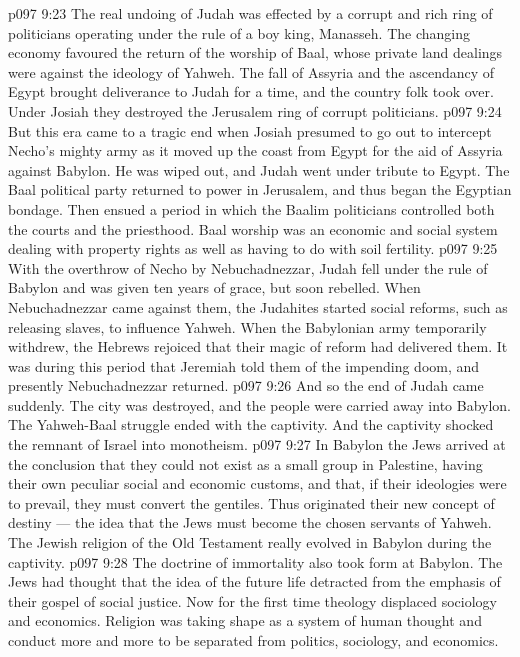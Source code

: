 \vs p097 9:23 \pc The real undoing of Judah was effected by a corrupt and rich ring of politicians operating under the rule of a boy king, Manasseh. The changing economy favoured the return of the worship of Baal, whose private land dealings were against the ideology of Yahweh. The fall of Assyria and the ascendancy of Egypt brought deliverance to Judah for a time, and the country folk took over. Under Josiah they destroyed the Jerusalem ring of corrupt politicians.
\vs p097 9:24 But this era came to a tragic end when Josiah presumed to go out to intercept Necho’s mighty army as it moved up the coast from Egypt for the aid of Assyria against Babylon. He was wiped out, and Judah went under tribute to Egypt. The Baal political party returned to power in Jerusalem, and thus began the  Egyptian bondage. Then ensued a period in which the Baalim politicians controlled both the courts and the priesthood. Baal worship was an economic and social system dealing with property rights as well as having to do with soil fertility.
\vs p097 9:25 With the overthrow of Necho by Nebuchadnezzar, Judah fell under the rule of Babylon and was given ten years of grace, but soon rebelled. When Nebuchadnezzar came against them, the Judahites started social reforms, such as releasing slaves, to influence Yahweh. When the Babylonian army temporarily withdrew, the Hebrews rejoiced that their magic of reform had delivered them. It was during this period that Jeremiah told them of the impending doom, and presently Nebuchadnezzar returned.
\vs p097 9:26 And so the end of Judah came suddenly. The city was destroyed, and the people were carried away into Babylon. The Yahweh\hyp{}Baal struggle ended with the captivity. And the captivity shocked the remnant of Israel into monotheism.
\vs p097 9:27 \pc In Babylon the Jews arrived at the conclusion that they could not exist as a small group in Palestine, having their own peculiar social and economic customs, and that, if their ideologies were to prevail, they must convert the gentiles. Thus originated their new concept of destiny --- the idea that the Jews must become the chosen servants of Yahweh. The Jewish religion of the Old Testament really evolved in Babylon during the captivity.
\vs p097 9:28 The doctrine of immortality also took form at Babylon. The Jews had thought that the idea of the future life detracted from the emphasis of their gospel of social justice. Now for the first time theology displaced sociology and economics. Religion was taking shape as a system of human thought and conduct more and more to be separated from politics, sociology, and economics.

